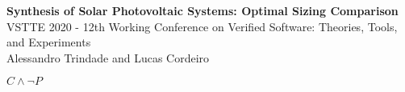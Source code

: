 \documentclass[12pt,a4paper]{article}
\begin{document}
\begin{center}
\textbf{Synthesis of Solar Photovoltaic Systems: Optimal Sizing Comparison} \\

VSTTE 2020 - 12th Working Conference on Verified Software: Theories, Tools, and Experiments\\

Alessandro Trindade and Lucas Cordeiro \\
\end{center}

$C \wedge \neg P$

%
%
\end{document}
